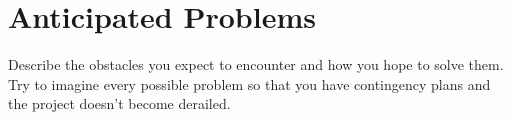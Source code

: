 
\section[Anticipated Problems]{Anticipated Problems}

Describe the obstacles you expect to encounter and how you hope to solve them. Try to imagine every possible problem so that you have contingency plans and the project doesn't become derailed.